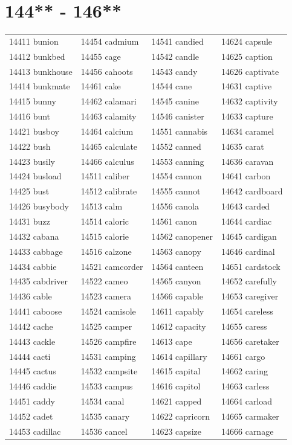 \documentclass[10pt, oneside]{book}
\begin{document}
\begin{table}
	\centering
	\section*{144** - 146**}
	\begin{tabular}{l l l l}
14411 bunion &14454 cadmium &14541 candied &14624 capsule\\
14412 bunkbed &14455 cage &14542 candle &14625 caption\\
14413 bunkhouse &14456 cahoots &14543 candy &14626 captivate\\
14414 bunkmate &14461 cake &14544 cane &14631 captive\\
14415 bunny &14462 calamari &14545 canine &14632 captivity\\
14416 bunt &14463 calamity &14546 canister &14633 capture\\
14421 busboy &14464 calcium &14551 cannabis &14634 caramel\\
14422 bush &14465 calculate &14552 canned &14635 carat\\
14423 busily &14466 calculus &14553 canning &14636 caravan\\
14424 busload &14511 caliber &14554 cannon &14641 carbon\\
14425 bust &14512 calibrate &14555 cannot &14642 cardboard\\
14426 busybody &14513 calm &14556 canola &14643 carded\\
14431 buzz &14514 caloric &14561 canon &14644 cardiac\\
14432 cabana &14515 calorie &14562 canopener &14645 cardigan\\
14433 cabbage &14516 calzone &14563 canopy &14646 cardinal\\
14434 cabbie &14521 camcorder &14564 canteen &14651 cardstock\\
14435 cabdriver &14522 cameo &14565 canyon &14652 carefully\\
14436 cable &14523 camera &14566 capable &14653 caregiver\\
14441 caboose &14524 camisole &14611 capably &14654 careless\\
14442 cache &14525 camper &14612 capacity &14655 caress\\
14443 cackle &14526 campfire &14613 cape &14656 caretaker\\
14444 cacti &14531 camping &14614 capillary &14661 cargo\\
14445 cactus &14532 campsite &14615 capital &14662 caring\\
14446 caddie &14533 campus &14616 capitol &14663 carless\\
14451 caddy &14534 canal &14621 capped &14664 carload\\
14452 cadet &14535 canary &14622 capricorn &14665 carmaker\\
14453 cadillac &14536 cancel &14623 capsize &14666 carnage\\
	\end{tabular}
 \end{table}
\clearpage
\end{document}
